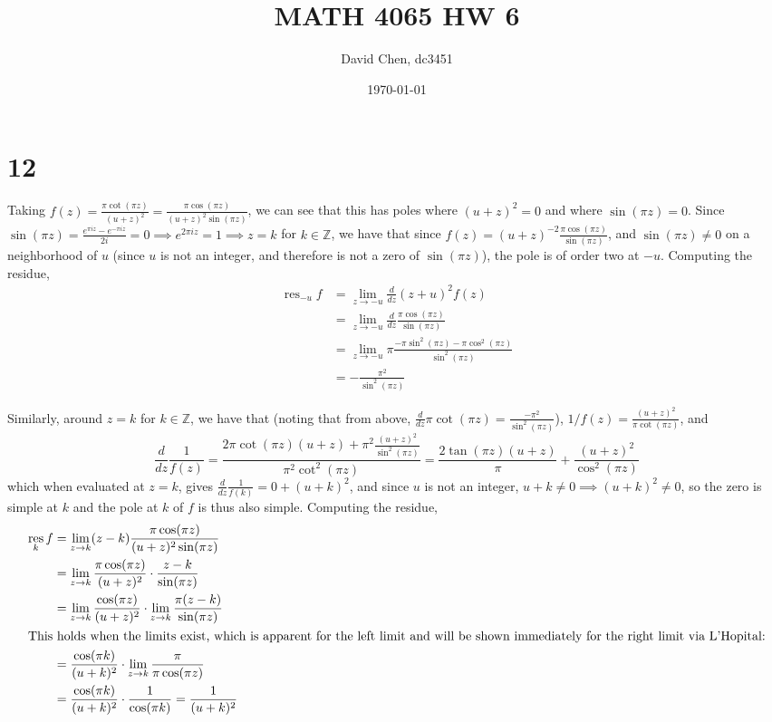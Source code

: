 \documentclass[12pt,letterpaper]{article}
\title{MATH 4065 HW 6}
\author{David Chen, dc3451}
\date{\today}
\theoremstyle{definition}
\newcommand{\Z}{\mathbb{Z}}
\DeclareMathOperator{\res}{res}
\begin{document}
\maketitle

\section*{12}

Taking $f(z) = \frac{\pi \cot(\pi z)}{(u + z)^{2}} = \frac{\pi \cos(\pi z)}{(u + z)^{2}\sin(\pi z)}$, we can see that this has poles where $(u + z)^{2} = 0$ and where $\sin(\pi z) = 0$. Since $\sin(\pi z) = \frac{e^{\pi i z} - e^{-\pi i z}}{2i} = 0 \implies e^{2\pi i z} = 1 \implies z = k$ for $k \in \Z$, we have that since $f(z) = (u+z)^{-2}\frac{\pi \cos(\pi z)}{\sin(\pi z)}$, and $\sin(\pi z) \neq 0$ on a neighborhood of $u$ (since $u$ is not an integer, and therefore is not a zero of $\sin(\pi z)$), the pole is of order two at $-u$. Computing the residue,
\begin{align*}
  \res_{-u} f &= \lim_{z \rightarrow -u} \frac{d}{dz}(z+u)^{2}f(z) \\
              &= \lim_{z \rightarrow -u} \frac{d}{dz}\frac{\pi \cos(\pi z)}{\sin(\pi z)} \\
              &= \lim_{z \rightarrow -u} \pi\frac{-\pi\sin^{2}(\pi z) - \pi\cos^{2}(\pi z)}{\sin^{2}(\pi z)} \\
              &= -\frac{\pi^{2}}{\sin^{2}(\pi z)}
\end{align*}

Similarly, around $z = k$ for $k \in \Z$, we have that (noting that from above, $\frac{d}{dz}\pi\cot(\pi z) = \frac{-\pi^{2}}{\sin^{2}(\pi z)}$), $1/f(z) = \frac{(u+z)^{2}}{\pi \cot(\pi z)}$, and
\[
  \frac{d}{dz}\frac{1}{f(z)} = \frac{2\pi \cot(\pi z)(u + z) + \pi^{2}\frac{(u + z)^{2}}{\sin^{2}(\pi z)}}{\pi^{2}\cot^{2}(\pi z)} = \frac{2\tan(\pi z)(u + z)}{\pi} + \frac{(u+z)^{2}}{\cos^{2}(\pi z)}
\]
which when evaluated at $z = k$, gives $\frac{d}{dz}\frac{1}{f(k)} = 0 + (u + k)^{2}$, and since $u$ is not an integer, $u + k \neq 0 \implies (u+k)^{2} \neq 0$, so the zero is simple at $k$ and the pole at $k$ of $f$ is thus also simple. Computing the residue,
\begin{align*}
  \res_{k}f &= \lim_{z \rightarrow k}(z - k)\frac{\pi \cos(\pi z)}{(u + z)^{2}\sin(\pi z)} \\
            &= \lim_{z \rightarrow k}\frac{\pi \cos(\pi z)}{(u + z)^{2}} \cdot \frac{z-k}{\sin(\pi z)} \\
            &= \lim_{z \rightarrow k}\frac{\cos(\pi z)}{(u + z)^{2}} \cdot \lim_{z \rightarrow k}\frac{\pi (z-k)}{\sin(\pi z)} \\
  \intertext{This holds when the limits exist, which is apparent for the left limit and will be shown immediately for the right limit via L'Hopital:}
            &= \frac{\cos(\pi k)}{(u + k)^{2}} \cdot \lim_{z \rightarrow k}\frac{\pi}{\pi\cos(\pi z)} \\
            &= \frac{\cos(\pi k)}{(u + k)^{2}} \cdot \frac{1}{\cos(\pi k)} = \frac{1}{(u+k)^{2}}
\end{align*}
\end{document}
